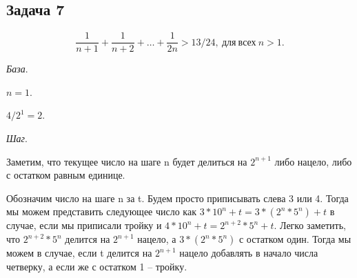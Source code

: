 	\subsection{Задача 7}
	\[
	\frac{1}{n + 1} + \frac{1}{n + 2} + \dots + \frac{1}{2n} > 13/24,\  для\  всех\  n > 1.
	\]
	
	\textit{База}.

	$ n = 1$.
	
	$ 4/2^1 = 2$.
	
	\textit{Шаг}.
	
	Заметим, что текущее число на шаге n будет делиться на $2^{n+1}$ либо нацело, либо с остатком равным единице. 
	
	Обозначим число на шаге n за t.
	Будем просто приписывать слева 3 или 4. Тогда мы можем представить следующее число как $3*10^n + t = 3*(2^n*5^n) + t$ в случае, если мы приписали тройку и $4*10^n + t = 2^{n+2}*5^n + t$. 
	Легко заметить, что $2^{n+2}*5^n$ делится на $2^{n+1}$ нацело, а $3*(2^n*5^n)$ с остатком один.
	Тогда мы можем в случае, если t делится на $2^{n+1}$ нацело добавлять в начало числа четверку, а если же с остатком 1 -- тройку.
	
